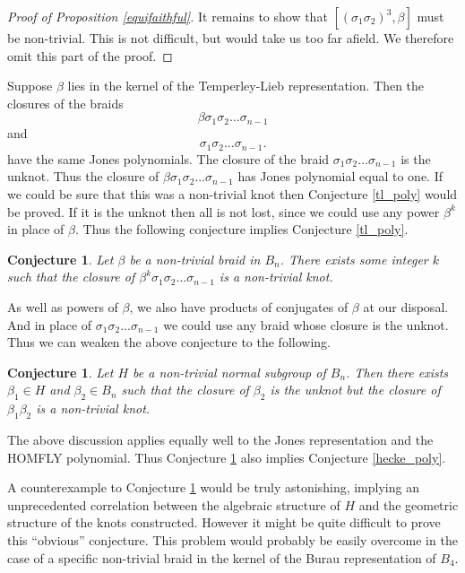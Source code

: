 \documentclass[10pt]{amsart}
\theoremstyle{plain}
\newtheorem{conj}[thm]{Conjecture}
\theoremstyle{definition}
\begin{document}
\begin{proof}[Proof of Proposition \ref{equifaithful}]
It remains to show that $[(\sigma_1 \sigma_2)^3,\beta]$ 
must be non-trivial.
This is not difficult,
but would take us too far afield.
We therefore omit this part of the proof.
\end{proof}

Suppose $\beta$ lies in the kernel of
the Temperley-Lieb representation.
Then the closures of the braids
$$\beta \sigma_1 \sigma_2 \dots \sigma_{n-1}$$
and
$$\sigma_1 \sigma_2 \dots \sigma_{n-1}.$$
have the same Jones polynomials.
The closure of the braid $\sigma_1 \sigma_2 \dots \sigma_{n-1}$ is the unknot.
Thus the closure of $\beta \sigma_1 \sigma_2 \dots \sigma_{n-1}$
has Jones polynomial equal to one.
If we could be sure that this was a non-trivial knot
then Conjecture \ref{tl_poly} would be proved.
If it is the unknot then all is not lost, since
we could use any power $\beta^k$ in place of $\beta$.
Thus the following conjecture
implies Conjecture \ref{tl_poly}.

\begin{conj}
Let $\beta$ be a non-trivial braid in $B_n$.
There exists some integer $k$
such that the closure of $\beta^k\sigma_1\sigma_2 \dots \sigma_{n-1}$
is a non-trivial knot.
\end{conj}

As well as powers of $\beta$,
we also have products of conjugates of $\beta$ at our disposal.
And in place of $\sigma_1\sigma_2\dots\sigma_{n-1}$
we could use any braid whose closure is the unknot.
Thus we can weaken the above conjecture to the following.

\begin{conj}
\label{true}
Let $H$ be a non-trivial normal subgroup of $B_n$.
Then there exists $\beta_1 \in H$ and $\beta_2 \in B_n$
such that the closure of $\beta_2$ is the unknot
but the closure of $\beta_1\beta_2$ is a non-trivial knot.
\end{conj}

The above discussion applies equally well to
the Jones representation and the HOMFLY polynomial.
Thus Conjecture \ref{true} also implies Conjecture \ref{hecke_poly}.

A counterexample to Conjecture \ref{true}
would be truly astonishing,
implying an unprecedented correlation
between the algebraic structure of $H$
and the geometric structure of the knots constructed.
However it might be quite difficult to prove this ``obvious'' conjecture.
This problem would probably be easily overcome
in the case of a specific non-trivial braid
in the kernel of the Burau representation of $B_4$.
\end{document}

